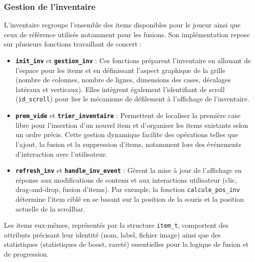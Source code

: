 \documentclass[11pt,a4paper]{article}
\begin{document}
\subsubsection{Gestion de l'inventaire}
L'inventaire regroupe l'ensemble des items disponibles pour le joueur ainsi que ceux de référence utilisés notamment pour les fusions. Son implémentation repose sur plusieurs fonctions travaillant de concert :
\begin{itemize}
    \item \textbf{\texttt{init\_inv}} et \textbf{\texttt{gestion\_inv}} : Ces fonctions préparent l'inventaire en allouant de l'espace pour les items et en définissant l'aspect graphique de la grille (nombre de colonnes, nombre de lignes, dimensions des cases, décalages latéraux et verticaux). Elles intègrent également l'identifiant de scroll (\texttt{id\_scroll}) pour lier le mécanisme de défilement à l'affichage de l'inventaire.
    \item \textbf{\texttt{prem\_vide}} et \textbf{\texttt{trier\_inventaire}} : Permettent de localiser la première case libre pour l'insertion d'un nouvel item et d'organiser les items existants selon un ordre précis. Cette gestion dynamique facilite des opérations telles que l'ajout, la fusion et la suppression d'items, notamment lors des événements d'interaction avec l'utilisateur.
    \item \textbf{\texttt{refresh\_inv}} et \textbf{\texttt{handle\_inv\_event}} : Gèrent la mise à jour de l’affichage en réponse aux modifications de contenu et aux interactions utilisateur (clic, drag-and-drop, fusion d'items). Par exemple, la fonction \texttt{calcule\_pos\_inv} détermine l'item ciblé en se basant sur la position de la souris et la position actuelle de la scrollbar.
\end{itemize}
Les items eux-mêmes, représentés par la structure \texttt{item\_t}, comportent des attributs précisant leur identité (nom, label, fichier image) ainsi que des statistiques (statistiques de boost, rareté) essentielles pour la logique de fusion et de progression.
\end{document}
